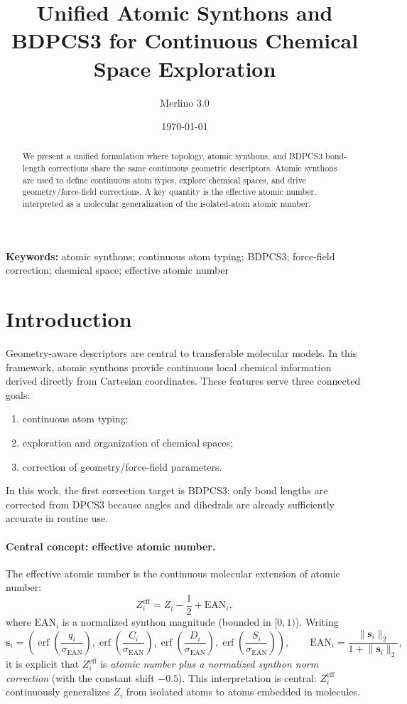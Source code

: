 \documentclass[a4paper,11pt]{article}
\title{Unified Atomic Synthons and BDPCS3 for Continuous Chemical Space Exploration}
\author{Merlino 3.0}
\date{\today}
\begin{document}
\maketitle

\begin{abstract}
We present a unified formulation where topology, atomic synthons, and BDPCS3 bond-length corrections share the same continuous geometric descriptors. Atomic synthons are used to define continuous atom types, explore chemical spaces, and drive geometry/force-field corrections. A key quantity is the effective atomic number, interpreted as a molecular generalization of the isolated-atom atomic number.
\end{abstract}
\noindent\textbf{Keywords:} atomic synthons; continuous atom typing; BDPCS3; force-field correction; chemical space; effective atomic number

\section{Introduction}
Geometry-aware descriptors are central to transferable molecular models. In this framework, atomic synthons provide continuous local chemical information derived directly from Cartesian coordinates. These features serve three connected goals:
\begin{enumerate}
\item continuous atom typing;
\item exploration and organization of chemical spaces;
\item correction of geometry/force-field parameters.
\end{enumerate}

In this work, the first correction target is BDPCS3: only bond lengths are corrected from DPCS3 because angles and dihedrals are already sufficiently accurate in routine use.

\paragraph{Central concept: effective atomic number.}
The effective atomic number is the continuous molecular extension of atomic number:
\begin{equation}
Z^{\mathrm{eff}}_i = Z_i-\frac{1}{2}+\mathrm{EAN}_i,
\end{equation}
where $\mathrm{EAN}_i$ is a normalized synthon magnitude (bounded in $[0,1)$). Writing
\begin{equation}
\mathbf{s}_i=
\left(
\operatorname{erf}\!\left(\frac{q_i}{\sigma_{\mathrm{EAN}}}\right),
\operatorname{erf}\!\left(\frac{C_i}{\sigma_{\mathrm{EAN}}}\right),
\operatorname{erf}\!\left(\frac{D_i}{\sigma_{\mathrm{EAN}}}\right),
\operatorname{erf}\!\left(\frac{S_i}{\sigma_{\mathrm{EAN}}}\right)
\right),
\qquad
\mathrm{EAN}_i=\frac{\lVert\mathbf{s}_i\rVert_2}{1+\lVert\mathbf{s}_i\rVert_2},
\end{equation}
it is explicit that $Z_i^{\mathrm{eff}}$ is \emph{atomic number plus a normalized synthon norm correction} (with the constant shift $-0.5$). This interpretation is central: $Z_i^{\mathrm{eff}}$ continuously generalizes $Z_i$ from isolated atoms to atoms embedded in molecules.
\end{document}
